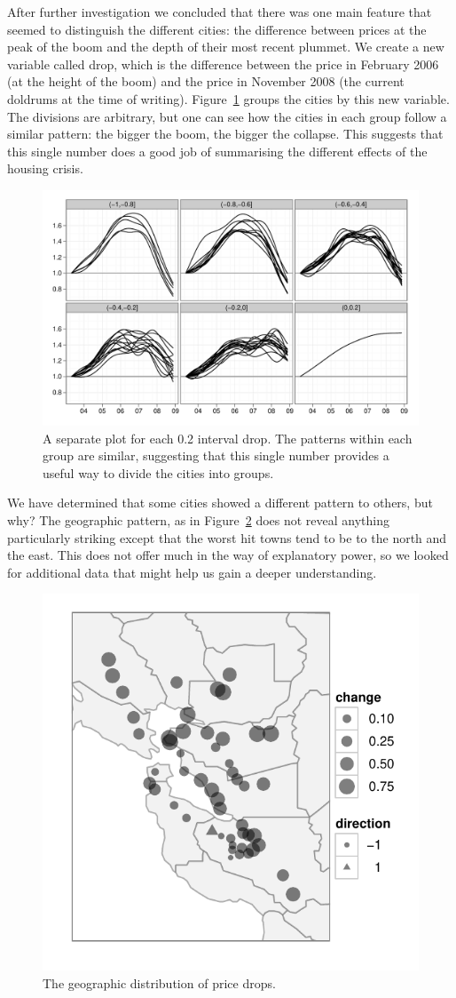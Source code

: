 \documentclass[oneside]{article}
\begin{document}
After further investigation we concluded that there was one main feature that seemed to distinguish the different cities: the difference between prices at the peak of the boom and the depth of their most recent plummet.  We create a new variable called drop, which is the difference between the price in February 2006 (at the height of the boom) and the price in November 2008 (the current doldrums at the time of writing). Figure~\ref{fig:groups} groups the cities by this new variable.  The divisions are arbitrary, but one can see how the cities in each group follow a similar pattern: the bigger the boom, the bigger the collapse.  This suggests that this single number does a good job of summarising the different effects of the housing crisis.

\begin{figure}[htbp]
  \centering
    \includegraphics[width=0.75\linewidth]{cities-indexed-grouped}
  \caption{A separate plot for each 0.2 interval drop.  The patterns within each group are similar, suggesting that this single number provides a useful way to divide the cities into groups.}
  \label{fig:groups}
\end{figure}

We have determined that some cities showed a different pattern to others, but why? The geographic pattern, as in Figure~\ref{fig:geo} does not reveal anything particularly striking except that the worst hit towns tend to be to the north and the east. This does not offer much in the way of explanatory power, so we looked for additional data that might help us gain a deeper understanding. 

\begin{figure}[htbp]
  \centering
    \includegraphics[width=0.5\linewidth]{cities-geo-changes}
  \caption{The geographic distribution of price drops.}
  \label{fig:geo}
\end{figure}
\end{document}
